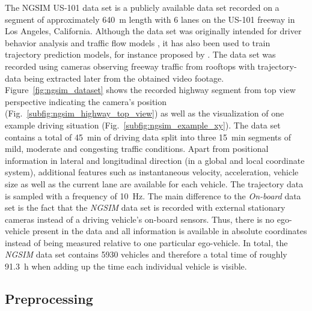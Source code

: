The \ac{NGSIM} US-101 data set \parencite{NGSIM-US101} is a publicly available data set recorded on a segment of approximately \SI{640}{\meter} length with \num{6} lanes on the US-101 freeway in Los Angeles, California.
Although the data set was originally intended for driver behavior analysis and traffic flow models \parencite{He2017}, it has also been used to train trajectory prediction models, for instance proposed by \textcite{Altche2018, Deo2018}.
The data set was recorded using cameras observing freeway traffic from rooftops with trajectory-data being extracted later from the obtained video footage.
Figure~\ref{fig:ngsim_dataset} shows the recorded highway segment from top view perspective indicating the camera's position (Fig.~\ref{subfig:ngsim_highway_top_view}) as well as the visualization of one example driving situation (Fig.~\ref{subfig:ngsim_example_xy}).
The data set contains a total of \SI{45}{\minute} of driving data split into three \SI{15}{\minute} segments of mild, moderate and congesting traffic conditions.
Apart from positional information in lateral and longitudinal direction (in a global and local coordinate system), additional features such as instantaneous velocity, acceleration, vehicle size as well as the current lane are available for each vehicle.
The trajectory data is sampled with a frequency of \SI{10}{\hertz}.
The main difference to the \emph{On-board} data set is the fact that the \emph{\ac{NGSIM}} data set is recorded with external stationary cameras instead of a driving vehicle's on-board sensors.
Thus, there is no ego-vehicle present in the data and all information is available in absolute coordinates instead of being measured relative to one particular ego-vehicle.
In total, the \emph{\ac{NGSIM}} data set contains \num{5930} vehicles and therefore a total time of roughly \SI{91.3}{\hour} when adding up the time each individual vehicle is visible.

\subsection{Preprocessing}
\label{subsec:preproc}

